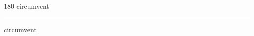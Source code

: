 
\begin{frame}
\begin{center}
\begin{turn}{180}
{\fontsize{2.5cm}{1em}\selectfont circumvent}
\end{turn}
\vspace{1em}\par  
\hrule
\vspace{1em}\par  
{\fontsize{2.5cm}{1em}\selectfont circumvent}
\end{center}
\end{frame}
